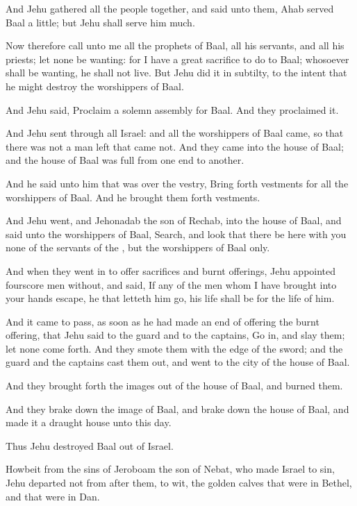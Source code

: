 \verse And Jehu gathered all the people together, and said unto them, Ahab served Baal a little; but Jehu shall serve him much.

\verse Now therefore call unto me all the prophets of Baal, all his servants, and all his priests; let none be wanting: for I have a great sacrifice to do to Baal; whosoever shall be wanting, he shall not live. But Jehu did it in subtilty, to the intent that he might destroy the worshippers of Baal.

\verse And Jehu said, Proclaim a solemn assembly for Baal. And they proclaimed it.

\verse And Jehu sent through all Israel: and all the worshippers of Baal came, so that there was not a man left that came not. And they came into the house of Baal; and the house of Baal was full from one end to another.

\verse And he said unto him that was over the vestry, Bring forth vestments for all the worshippers of Baal. And he brought them forth vestments.

\verse And Jehu went, and Jehonadab the son of Rechab, into the house of Baal, and said unto the worshippers of Baal, Search, and look that there be here with you none of the servants of the \LORD, but the worshippers of Baal only.

\verse And when they went in to offer sacrifices and burnt offerings, Jehu appointed fourscore men without, and said, If any of the men whom I have brought into your hands escape, he that letteth him go, his life shall be for the life of him.

\verse And it came to pass, as soon as he had made an end of offering the burnt offering, that Jehu said to the guard and to the captains, Go in, and slay them; let none come forth. And they smote them with the edge of the sword; and the guard and the captains cast them out, and went to the city of the house of Baal.

\verse And they brought forth the images out of the house of Baal, and burned them.

\verse And they brake down the image of Baal, and brake down the house of Baal, and made it a draught house unto this day.

\verse Thus Jehu destroyed Baal out of Israel.

\verse Howbeit from the sins of Jeroboam the son of Nebat, who made Israel to sin, Jehu departed not from after them, to wit, the golden calves that were in Bethel, and that were in Dan.

